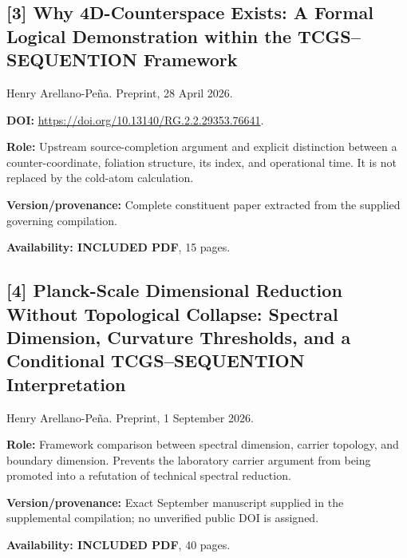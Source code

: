 \documentclass[11pt,a4paper]{article}
\begin{document}
\par\medskip
\begin{minipage}{\textwidth}
\subsection*{[3] Why 4D-Counterspace Exists: A Formal Logical Demonstration within the TCGS--SEQUENTION Framework}
Henry Arellano-Pe\~na. Preprint, 28 April 2026.

\textbf{DOI:} \url{https://doi.org/10.13140/RG.2.2.29353.76641}.

\textbf{Role:} Upstream source-completion argument and explicit distinction between a counter-coordinate, foliation structure, its index, and operational time. It is not replaced by the cold-atom calculation.

\textbf{Version/provenance:} Complete constituent paper extracted from the supplied governing compilation.

\textbf{Availability: INCLUDED PDF}, 15 pages.\par
{}
\end{minipage}
\par\medskip
\begin{minipage}{\textwidth}
\subsection*{[4] Planck-Scale Dimensional Reduction Without Topological Collapse: Spectral Dimension, Curvature Thresholds, and a Conditional TCGS--SEQUENTION Interpretation}
Henry Arellano-Pe\~na. Preprint, 1 September 2026.

\textbf{Role:} Framework comparison between spectral dimension, carrier topology, and boundary dimension. Prevents the laboratory carrier argument from being promoted into a refutation of technical spectral reduction.

\textbf{Version/provenance:} Exact September manuscript supplied in the supplemental compilation; no unverified public DOI is assigned.

\textbf{Availability: INCLUDED PDF}, 40 pages.\par
{}
\end{minipage}
\par\medskip
\end{document}
